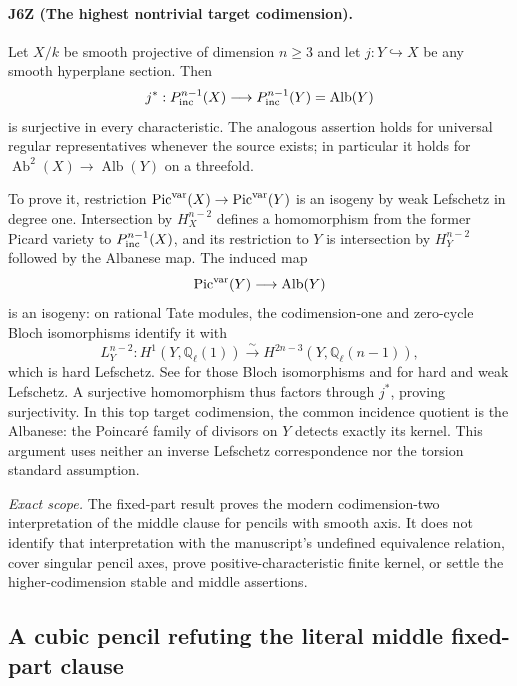 \paragraph{J6Z (The highest nontrivial target codimension).}
Let $X/k$ be smooth projective of dimension $n\geq3$ and let
$j:Y\hookrightarrow X$ be any smooth hyperplane section. Then
\[
 j^*:P^{n-1}_{\rm inc}(X)\longrightarrow
       P^{n-1}_{\rm inc}(Y)=\operatorname{Alb}(Y)
\]
is surjective in every characteristic. The analogous assertion
holds for universal regular representatives whenever the source
exists; in particular it holds for
$\operatorname{Ab}^2(X)\to\operatorname{Alb}(Y)$ on a threefold.

To prove it, restriction
$\operatorname{Pic}^{\rm var}(X)\to\operatorname{Pic}^{\rm var}(Y)$
is an isogeny by weak Lefschetz in degree one. Intersection by
$H_X^{n-2}$ defines a homomorphism from the former Picard
variety to $P^{n-1}_{\rm inc}(X)$, and its restriction to $Y$
is intersection by $H_Y^{n-2}$ followed by the Albanese map.
The induced map
\[
 \operatorname{Pic}^{\rm var}(Y)\longrightarrow\operatorname{Alb}(Y)
\]
is an isogeny: on rational Tate modules, the codimension-one
and zero-cycle Bloch isomorphisms identify it with
\[
 L_Y^{n-2}:H^1(Y,\mathbb Q_\ell(1))
       \xrightarrow{\ \sim\ }H^{2n-3}(Y,\mathbb Q_\ell(n-1)),
\]
which is hard Lefschetz. See
\cite[Section 8.1, pp.~30--31]{DGJ_ACMVFunctor} for those
Bloch isomorphisms and
\cite[Theorem 4.1.1 and (4.1.6), pp.~217--219]{DGJ_Deligne1980}
for hard and weak Lefschetz. A surjective homomorphism thus
factors through $j^*$, proving surjectivity. In this top target
codimension, the common incidence quotient is the Albanese:
the Poincar\'e family of divisors on $Y$ detects exactly its
kernel. This argument uses neither an inverse Lefschetz
correspondence nor the torsion standard assumption.

\emph{Exact scope.}
The fixed-part result proves the modern codimension-two
interpretation of the middle clause for pencils with smooth
axis. It does not identify that interpretation with the
manuscript's undefined equivalence relation, cover singular
pencil axes, prove positive-characteristic finite kernel, or
settle the higher-codimension stable and middle assertions.


\subsection{A cubic pencil refuting the literal middle fixed-part clause}
